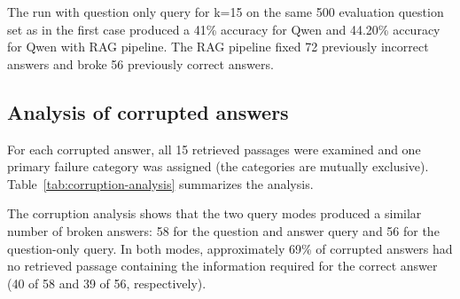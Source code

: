 \documentclass{article}
\begin{document}
The run with question only query for k=15 on the same 500 evaluation question set as in the first case produced 
a 41\% accuracy for Qwen and 44.20\% accuracy for Qwen with RAG pipeline. 
The RAG pipeline fixed 72 previously incorrect answers and broke 56 previously correct answers. 

\subsection{Analysis of corrupted answers}

For each corrupted answer, all 15 retrieved passages were examined and one primary
failure category was assigned (the categories are mutually exclusive).
Table~\ref{tab:corruption-analysis} summarizes the analysis.

\begin{table}[!htb]
\centering
\small
\setlength{\tabcolsep}{3pt}
\caption{Primary causes assigned to corrupted answers in the two 500-question
experiments at $k=15$.}
\label{tab:corruption-analysis}
\end{table}

The corruption analysis shows that the two query modes produced a similar number
of broken answers: 58 for the question and answer query and 56 for the
question-only query. In both modes, approximately 69\% of corrupted answers had
no retrieved passage containing the information required for the correct answer
(40 of 58 and 39 of 56, respectively).
\end{document}
